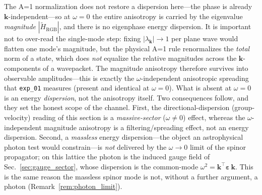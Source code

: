 The A=1 normalization does not restore a dispersion here---the phase is already
$\mathbf{k}$-independent---so at $\omega=0$ the entire anisotropy is carried by the
eigenvalue \emph{magnitude} $|\tilde H_\text{RGB}|$, and there is no eigenphase energy
dispersion. It is important not to over-read the single-mode step: fixing
$|\lambda_{\mathbf{k}}|\to1$ per plane wave would flatten one mode's magnitude, but the
physical A=1 rule renormalizes the \emph{total} norm of a state, which does \emph{not}
equalize the relative magnitudes across the $\mathbf{k}$-components of a wavepacket. The
magnitude anisotropy therefore survives into observable amplitudes---this is exactly the
$\omega$-independent anisotropic spreading that \texttt{exp\_01} measures (present and
identical at $\omega=0$). What is absent at $\omega=0$ is an energy \emph{dispersion},
not the anisotropy itself. Two consequences follow, and they set the honest scope of
the channel. First, the directional-dispersion (group-velocity) reading of this section
is a \emph{massive-sector} ($\omega\neq0$) effect, whereas the $\omega$-independent
magnitude anisotropy is a filtering/spreading effect, not an energy dispersion. Second,
a \emph{massless} energy dispersion---the object an astrophysical photon test would
constrain---is \emph{not} delivered by the $\omega\to0$ limit of the spinor propagator;
on this lattice the photon is the induced gauge field of Sec.~\ref{sec:gauge_sector},
whose
dispersion is the common-mode $\omega^2 = \mathbf{k}^{\!\top}\boldsymbol{\varepsilon}
\,\mathbf{k}$. This is the same reason the massless spinor mode is not, without a
further argument, a photon (Remark~\ref{rem:photon_limit}).

